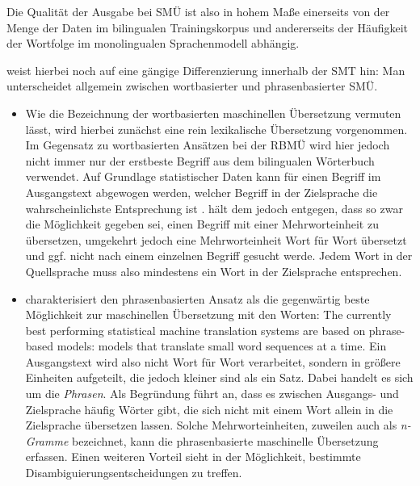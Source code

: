 Die Qualität der Ausgabe bei SMÜ ist also in hohem Maße einerseits von der Menge der Daten im bilingualen Trainingskorpus und andererseits der Häufigkeit der Wortfolge im monolingualen Sprachenmodell abhängig.

\citet[11]{stein_maschinelle_2009} weist hierbei noch auf eine gängige Differenzierung innerhalb der SMT hin: \glqq Man unterscheidet allgemein zwischen wortbasierter und phrasenbasierter SMÜ.\grqq{}

\begin{itemize}

\item Wie die Bezeichnung der wortbasierten maschinellen Übersetzung vermuten lässt, wird hierbei zunächst eine rein lexikalische Übersetzung vorgenommen. Im Gegensatz zu wortbasierten Ansätzen bei der RBMÜ wird hier jedoch nicht immer nur der erstbeste Begriff aus dem bilingualen Wörterbuch verwendet. Auf Grundlage statistischer Daten kann für einen Begriff im Ausgangstext abgewogen werden, welcher Begriff in der Zielsprache die wahrscheinlichste Entsprechung ist \citep[82]{koehn_statistical_2009}. \citet[11]{stein_maschinelle_2009} hält dem jedoch entgegen, dass so zwar die Möglichkeit gegeben sei, einen Begriff mit einer Mehrworteinheit zu übersetzen, umgekehrt jedoch eine Mehrworteinheit Wort für Wort übersetzt und ggf. nicht nach einem einzelnen Begriff gesucht werde. \glqq Jedem Wort in der Quellsprache muss also mindestens ein Wort in der Zielsprache entsprechen.\grqq{} \citep[11]{stein_maschinelle_2009}

\item \citet[127]{koehn_statistical_2009} charakterisiert den phrasenbasierten Ansatz als die gegenwärtig beste Möglichkeit zur maschinellen Übersetzung mit den Worten: \glqq The currently best performing statistical machine translation systems are based on phrase-based models: models that translate small word sequences at a time.\grqq{} Ein Ausgangstext wird also nicht Wort für Wort verarbeitet, sondern in größere Einheiten aufgeteilt, die jedoch kleiner sind als ein Satz. Dabei handelt es sich um die \emph{Phrasen}. Als Begründung führt \citet[127]{koehn_statistical_2009} an, dass es zwischen Ausgangs- und Zielsprache häufig Wörter gibt, die sich nicht mit einem Wort allein in die Zielsprache übersetzen lassen. Solche Mehrworteinheiten, zuweilen auch als \emph{n-Gramme} bezeichnet, kann die phrasenbasierte maschinelle Übersetzung erfassen. Einen weiteren Vorteil sieht \citet[12]{stein_maschinelle_2009} in der Möglichkeit, \glqq bestimmte Disambiguierungsentscheidungen zu treffen.\grqq{}

\end{itemize}


